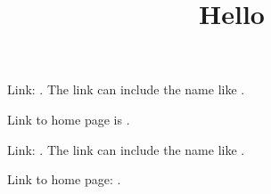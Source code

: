 \documentclass[10pt]{article}
\begin{document}
\title{Hello}
\maketitle





Link: .  The link can include the name like
.

Link to home page is \eczoo{}.

Link: .  The link can include the name like
.

Link to home page: \eczoohref{}.
\end{document}
